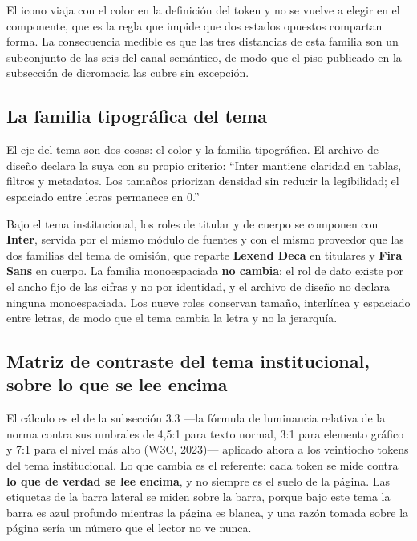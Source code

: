 El icono viaja con el color en la definición del token y no se vuelve a elegir en el componente, que
es la regla que impide que dos estados opuestos compartan forma. La consecuencia medible es que las
tres distancias de esta familia son un subconjunto de las seis del canal semántico, de modo que el
piso publicado en la subsección de dicromacia las cubre sin excepción.

\subsection{La familia tipográfica del tema}

El eje del tema son dos cosas: el color y la familia tipográfica. El archivo de diseño declara la
suya con su propio criterio: \enquote{Inter mantiene claridad en tablas, filtros y metadatos. Los
tamaños priorizan densidad sin reducir la legibilidad; el espaciado entre letras permanece en 0.}

Bajo el tema institucional, los roles de titular y de cuerpo se componen con \textbf{Inter},
servida por el mismo módulo de fuentes y con el mismo proveedor que las dos familias del tema de
omisión, que reparte \textbf{Lexend Deca} en titulares y \textbf{Fira Sans} en cuerpo. La familia
monoespaciada \textbf{no cambia}: el rol de dato existe por el ancho fijo de las cifras y no por
identidad, y el archivo de diseño no declara ninguna monoespaciada. Los nueve roles conservan
tamaño, interlínea y espaciado entre letras, de modo que el tema cambia la letra y no la jerarquía.


\subsection{Matriz de contraste del tema institucional, sobre lo que se lee encima}

El cálculo es el de la subsección 3.3 ---la fórmula de luminancia relativa de la norma contra sus
umbrales de 4{,}5:1 para texto normal, 3:1 para elemento gráfico y 7:1 para el nivel más alto (W3C,
2023)--- aplicado ahora a los veintiocho tokens del tema institucional. Lo que cambia es el
referente: cada token se mide contra \textbf{lo que de verdad se lee encima}, y no siempre es el
suelo de la página. Las etiquetas de la barra lateral se miden sobre la barra, porque bajo este
tema la barra es azul profundo mientras la página es blanca, y una razón tomada sobre la página
sería un número que el lector no ve nunca.

